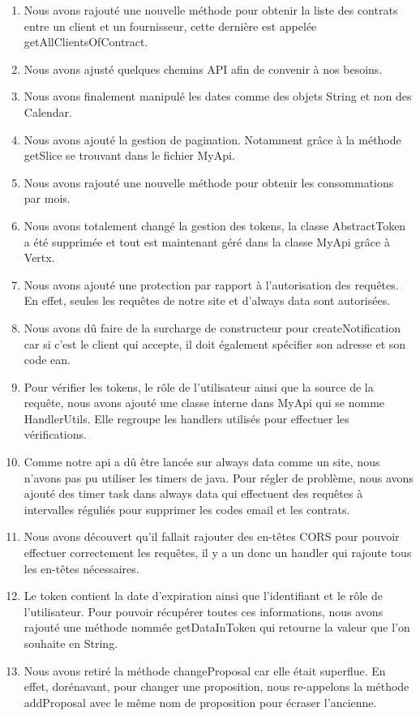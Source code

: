 \begin{enumerate}
\item Nous avons rajouté une nouvelle méthode pour obtenir la liste des contrats entre un client et un fournisseur, cette dernière est appelée getAllClientsOfContract.
\item Nous avons ajusté quelques chemins API afin de convenir à nos besoins.
\item Nous avons finalement manipulé les dates comme des objets String et non des Calendar.
\item Nous avons ajouté la gestion de pagination. Notamment grâce à la méthode getSlice se trouvant dans le fichier MyApi.
\item Nous avons rajouté une nouvelle méthode pour obtenir les consommations par mois.
\item Nous avons totalement changé la gestion des tokens, la classe AbstractToken a été supprimée et tout est maintenant géré dans la classe MyApi grâce à Vertx.
\item Nous avons ajouté une protection par rapport à l'autorisation des requêtes. En effet, seules les requêtes de notre site et d'always data sont autorisées.
\item Nous avons dû faire de la surcharge de constructeur pour createNotification car si c'est le client qui accepte, il doit également spécifier son adresse et son code ean.
\item Pour vérifier les tokens, le rôle de l'utilisateur ainsi que la source de la requête, nous avons ajouté une classe interne dans MyApi qui se nomme HandlerUtils. Elle regroupe les handlers utilisés pour effectuer les vérifications.
\item Comme notre api a dû être lancée sur always data comme un site, nous n'avons pas pu utiliser les timers de java. Pour régler de problème, nous avons ajouté des timer task dans always data qui effectuent des requêtes à intervalles réguliés pour supprimer les codes email et les contrats.
\item Nous avons découvert qu'il fallait rajouter des en-têtes CORS pour pouvoir effectuer correctement les requêtes, il y a un donc un handler qui rajoute tous les en-têtes nécessaires.
\item Le token contient la date d'expiration ainsi que l'identifiant et le rôle de l'utilisateur. Pour pouvoir récupérer toutes ces informations, nous avons rajouté une méthode nommée getDataInToken qui retourne la valeur que l'on souhaite en String.
\item Nous avons retiré la méthode changeProposal car elle était superflue. En effet, dorénavant, pour changer une proposition, nous re-appelons la méthode addProposal avec le même nom de proposition pour écraser l'ancienne.

\end{enumerate}
